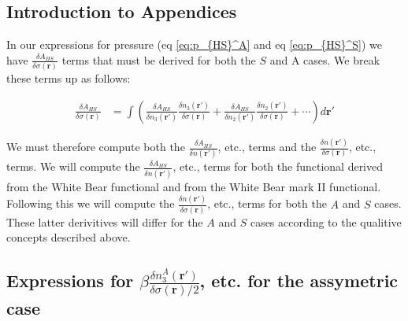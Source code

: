 \documentclass[letterpaper,twocolumn,amsmath,amssymb,jcp,10pt,aip]{revtex4-1}
\begin{document}
\begin{widetext}

\section*{Introduction to Appendices}

In our expressions for pressure (eq \ref{eq:p_{HS}^A} and eq
\ref{eq:p_{HS}^S}) we have $\frac{\delta A_{HS}}{\delta
  \sigma(\mathbf{r})}$ terms that must be derived for both the $S$ and A
cases.  We break these terms up as follows:

  \begin{align}
    \frac{\delta A_{HS}}{\delta \sigma(\mathbf{r})} &=
    \int \left(
    \frac{\delta A_{HS}}{\delta n_3(\mathbf{r}')}
    \frac{\delta n_3(\mathbf{r}')}{\delta \sigma(\mathbf{r})}
    +
    \frac{\delta A_{HS}}{\delta n_2(\mathbf{r}')}
    \frac{\delta n_2(\mathbf{r}')}{\delta \sigma(\mathbf{r})}
    + \cdots
    \right) d\mathbf{r}'
  \end{align}


We must therefore compute both the $\frac{\delta A_{HS}}{\delta
  n(\mathbf{r}')}$, etc., terms and the $\frac{\delta
  n(\mathbf{r}')}{\delta \sigma(\mathbf{r})}$, etc., terms.  We will
compute the $\frac{\delta A_{HS}}{\delta n(\mathbf{r}')}$, etc., terms
for both the functional derived from the White Bear
functional\cite{roth2002whitebear} and from the White Bear mark
II functional\cite{hansen2006density}.  Following this we will compute
the $\frac{\delta n(\mathbf{r}')}{\delta \sigma(\mathbf{r})}$, etc.,
terms for both the $A$ and $S$ cases.  These latter derivitives will
differ for the $A$ and $S$ cases according to the qualitive concepts
described above.


\subsection{Expressions for $\beta\frac{\delta n_3^{A}(\mathbf{r}')}{\delta \sigma(\mathbf{r})/2}$, etc. for the assymetric case}\label{appendix:g-A}


\end{widetext}
\end{document}
